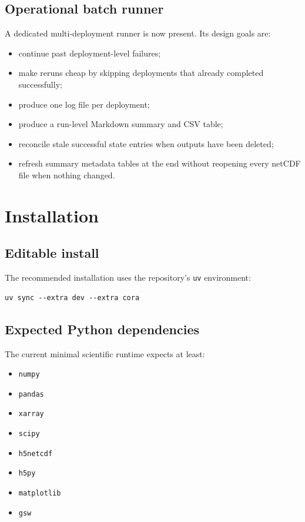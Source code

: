 \documentclass[11pt,a4paper]{article}
\newcommand{\pkg}[1]{\texttt{#1}}
\begin{document}
\subsection{Operational batch runner}

A dedicated multi-deployment runner is now present. Its design goals are:

\begin{itemize}[leftmargin=1.5em]
  \item continue past deployment-level failures;
  \item make reruns cheap by skipping deployments that already completed successfully;
  \item produce one log file per deployment;
  \item produce a run-level Markdown summary and CSV table;
  \item reconcile stale successful state entries when outputs have been deleted;
  \item refresh summary metadata tables at the end without reopening every netCDF file when nothing changed.
\end{itemize}

\section{Installation}

\subsection{Editable install}

The recommended installation uses the repository's \pkg{uv} environment:

\begin{lstlisting}[style=meopcode]
uv sync --extra dev --extra cora
\end{lstlisting}

\subsection{Expected Python dependencies}

The current minimal scientific runtime expects at least:

\begin{itemize}[leftmargin=1.5em]
  \item \pkg{numpy}
  \item \pkg{pandas}
  \item \pkg{xarray}
  \item \pkg{scipy}
  \item \pkg{h5netcdf}
  \item \pkg{h5py}
  \item \pkg{matplotlib}
  \item \pkg{gsw}
\end{itemize}
\end{document}
